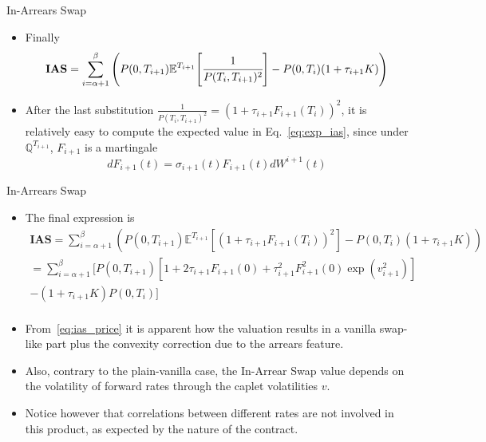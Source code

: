 \documentclass{beamer}
\begin{document}
\begin{frame}{In-Arrears Swap}
\begin{itemize}
\item<1-> Finally
\begin{equation}
\textbf{IAS}=\sum_{i=\alpha+1}^{\beta}\Bigg(P(0,T_{i+1})\mathbb{E}^{T_{i+1}}\Bigg[\cfrac{1}{P(T_i,T_{i+1})^2}\Bigg]-P(0,T_i)(1+\tau_{i+1}K)\Bigg)
\label{eq:exp_ias}
\end{equation}
\item<2-> After the last substitution $\frac{1}{P(T_i,T_{i+1})^2}=(1+\tau_{i+1}F_{i+1}(T_i))^2$, it is relatively easy to compute the expected value in Eq.~\ref{eq:exp_ias}, since under $\mathbb{Q}^{T_{i+1}}$, $F_{i+1}$ is a martingale
\begin{equation*}
dF_{i+1}(t) = \sigma_{i+1}(t)F_{i+1}(t)dW^{i+1}(t)
\end{equation*}
\end{itemize}
\end{frame}

\begin{frame}{In-Arrears Swap}
\begin{itemize}
\item<1-> The final expression is
\begin{equation}
\begin{gathered}
\textbf{IAS} = \sum_{i=\alpha+1}^{\beta}(P(0,T_{i+1})\mathbb{E}^{T_{i+1}}[(1+\tau_{i+1}F_{i+1}(T_i))^2]-P(0,T_i)(1+\tau_{i+1}K)) \\
=\sum_{i=\alpha+1}^{\beta}[
P(0,T_{i+1}) [1+2\tau_{i+1}F_{i+1}(0) + \tau_{i+1}^2 F_{i+1}^2(0)\exp(v_{i+1}^2)]\\
-(1+\tau_{i+1}K)P(0,T_i)] \\
\end{gathered}
\label{eq:ias_price}
\end{equation}
\item<2-> From~\cref{eq:ias_price} it is apparent how the valuation results in a vanilla swap-like part plus the convexity correction due to the arrears feature.
\item<3-> Also, contrary to the plain-vanilla case, the In-Arrear Swap value depends on the volatility of forward rates through the caplet volatilities $v$. 
\item<4-> Notice however that correlations between different rates are not involved in this product, as expected by the nature of the contract.

\end{itemize}
\end{frame}
\end{document}
